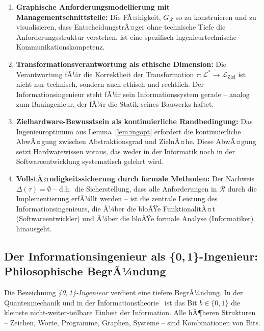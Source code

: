 ﻿\documentclass[a4paper,12pt]{article}
\theoremstyle{definition}
\begin{document}
\begin{enumerate}
  \item \textbf{Graphische Anforderungsmodellierung mit Managementschnittstelle:}
        Die FÃ¤higkeit, $G_\mathcal{R}$ so zu konstruieren und zu visualisieren, dass
        EntscheidungstrÃ¤ger ohne technische Tiefe die Anforderungsstruktur verstehen,
        ist eine spezifisch ingenieurtechnische Kommunikationskompetenz.

  \item \textbf{Transformationsverantwortung als ethische Dimension:}
        Die Verantwortung fÃ¼r die Korrektheit der Transformation
        $\tau: \mathcal{L}^* \to \mathcal{L}_{\text{Ziel}}$ ist nicht nur technisch,
        sondern auch ethisch und rechtlich. Der Informationsingenieur steht fÃ¼r sein
        Informationssystem gerade -- analog zum Bauingenieur, der fÃ¼r die Statik seines
        Bauwerks haftet.

  \item \textbf{Zielhardware-Bewusstsein als kontinuierliche Randbedingung:}
        Das Ingenieuroptimum aus Lemma~\ref{lem:ingopt} erfordert die kontinuierliche
        AbwÃ¤gung zwischen Abstraktionsgrad und ZielnÃ¤he. Diese AbwÃ¤gung setzt
        Hardwarewissen voraus, das weder in der Informatik noch in der
        Softwareentwicklung systematisch gelehrt wird.

  \item \textbf{VollstÃ¤ndigkeitssicherung durch formale Methoden:}
        Der Nachweis $\Delta(\tau) = \emptyset$ -- d.h.\ die Sicherstellung, dass alle
        Anforderungen in $\mathcal{R}$ durch die Implementierung erfÃ¼llt werden --
        ist die zentrale Leistung des Informationsingenieurs, die Ã¼ber die bloÃŸe
        FunktionalitÃ¤t (Softwareentwickler) und Ã¼ber die bloÃŸe formale Analyse
        (Informatiker) hinausgeht.
\end{enumerate}

\subsection{Der Informationsingenieur als \{0,\,1\}-Ingenieur: Philosophische BegrÃ¼ndung}

Die Bezeichnung \emph{\{0,\,1\}-Ingenieur} verdient eine tiefere BegrÃ¼ndung.
In der Quantenmechanik und in der Informationstheorie~\cite{shannon1948} ist das Bit
$b \in \{0,1\}$ die kleinste nicht-weiter-teilbare Einheit der Information. Alle
hÃ¶heren Strukturen -- Zeichen, Worte, Programme, Graphen, Systeme -- sind Kombinationen
von Bits.
\end{document}
